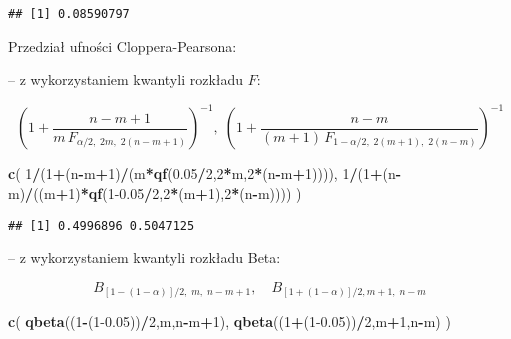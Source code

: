 \documentclass[polish,]{book}
\newenvironment{Shaded}{\begin{snugshade}}{\end{snugshade}}
\newcommand{\DecValTok}[1]{\textcolor[rgb]{0.00,0.00,0.81}{#1}}
\newcommand{\FloatTok}[1]{\textcolor[rgb]{0.00,0.00,0.81}{#1}}
\newcommand{\KeywordTok}[1]{\textcolor[rgb]{0.13,0.29,0.53}{\textbf{#1}}}
\newcommand{\NormalTok}[1]{#1}
\newcommand{\OperatorTok}[1]{\textcolor[rgb]{0.81,0.36,0.00}{\textbf{#1}}}
\begin{document}
\begin{verbatim}
## [1] 0.08590797
\end{verbatim}

Przedział ufności Cloppera-Pearsona:

-- z wykorzystaniem kwantyli rozkładu \(F\):

\begin{equation}
\left(1+\frac{n-m+1}{m\,F_{\alpha/2,\;2m,\;2(n-m+1)}}\right)^{-1},\;\left(1+\frac{n-m}{(m+1)\,F_{1-\alpha/2,\;2(m+1),\;2(n-m)}}\right)^{-1}
\label{eq:wz1154}
\end{equation}

\begin{Shaded}
\begin{Highlighting}[]
\KeywordTok{c}\NormalTok{( }\DecValTok{1}\OperatorTok{/}\NormalTok{(}\DecValTok{1}\OperatorTok{+}\NormalTok{(n}\OperatorTok{-}\NormalTok{m}\OperatorTok{+}\DecValTok{1}\NormalTok{)}\OperatorTok{/}\NormalTok{(m}\OperatorTok{*}\KeywordTok{qf}\NormalTok{(}\FloatTok{0.05}\OperatorTok{/}\DecValTok{2}\NormalTok{,}\DecValTok{2}\OperatorTok{*}\NormalTok{m,}\DecValTok{2}\OperatorTok{*}\NormalTok{(n}\OperatorTok{-}\NormalTok{m}\OperatorTok{+}\DecValTok{1}\NormalTok{)))),}
   \DecValTok{1}\OperatorTok{/}\NormalTok{(}\DecValTok{1}\OperatorTok{+}\NormalTok{(n}\OperatorTok{-}\NormalTok{m)}\OperatorTok{/}\NormalTok{((m}\OperatorTok{+}\DecValTok{1}\NormalTok{)}\OperatorTok{*}\KeywordTok{qf}\NormalTok{(}\DecValTok{1}\FloatTok{-0.05}\OperatorTok{/}\DecValTok{2}\NormalTok{,}\DecValTok{2}\OperatorTok{*}\NormalTok{(m}\OperatorTok{+}\DecValTok{1}\NormalTok{),}\DecValTok{2}\OperatorTok{*}\NormalTok{(n}\OperatorTok{-}\NormalTok{m)))) )}
\end{Highlighting}
\end{Shaded}

\begin{verbatim}
## [1] 0.4996896 0.5047125
\end{verbatim}

-- z wykorzystaniem kwantyli rozkładu Beta:

\begin{equation}
B_{[1-(1-\alpha)]/2,\;m,\;n-m+1},\quad B_{[1+(1-\alpha)]/2,m+1,\;n-m}
\label{eq:wz1155}
\end{equation}

\begin{Shaded}
\begin{Highlighting}[]
\KeywordTok{c}\NormalTok{( }\KeywordTok{qbeta}\NormalTok{((}\DecValTok{1}\OperatorTok{-}\NormalTok{(}\DecValTok{1}\FloatTok{-0.05}\NormalTok{))}\OperatorTok{/}\DecValTok{2}\NormalTok{,m,n}\OperatorTok{-}\NormalTok{m}\OperatorTok{+}\DecValTok{1}\NormalTok{), }\KeywordTok{qbeta}\NormalTok{((}\DecValTok{1}\OperatorTok{+}\NormalTok{(}\DecValTok{1}\FloatTok{-0.05}\NormalTok{))}\OperatorTok{/}\DecValTok{2}\NormalTok{,m}\OperatorTok{+}\DecValTok{1}\NormalTok{,n}\OperatorTok{-}\NormalTok{m) )}
\end{Highlighting}
\end{Shaded}
\end{document}

